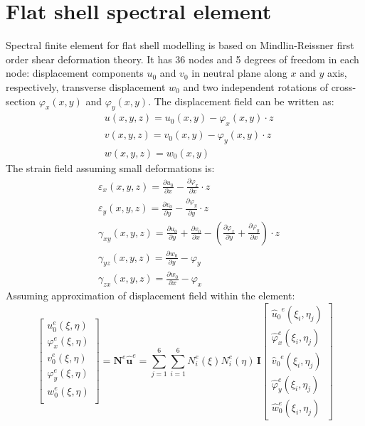 \documentclass[preprint,12pt]{elsarticle}
\renewcommand{\vec}[1]{\mathbf{#1}}
\renewcommand{\bm}[1]{\mathbf{#1}}
\begin{document}
	\section{Flat shell spectral element}
	Spectral finite element for flat shell modelling is based on Mindlin-Reissner first order shear deformation theory. It has 36 nodes and 5 degrees of freedom in each node: displacement components $u_0$ and $v_0$ in neutral plane along $x$ and $y$ axis, respectively, transverse displacement $w_0$ and two independent rotations of cross-section $\varphi_x(x,y)$ and $\varphi_y(x,y)$. The displacement field can be written as:
	\begin{equation}
	\begin{split}
	& u(x,y,z)=u_0(x,y) - \varphi_x(x,y) \cdot z\\
	& v(x,y,z)=v_0(x,y) - \varphi_y(x,y) \cdot z\\
	& w(x,y,z)=w_0(x,y) \label{eq:delam_platedispl}
	\end{split}
	\end{equation}
	The strain field assuming small deformations is:
	\begin{equation}
	\begin{split}
	& \varepsilon_x(x,y,z)= \frac{\partial u_0}{\partial x} - \frac{\partial \varphi_x}{\partial x} \cdot z\\
	& \varepsilon_y(x,y,z)=\frac{\partial v_0}{\partial y} - \frac{\partial \varphi_y}{\partial y} \cdot z\\
	& \gamma_{xy}(x,y,z)= \frac{\partial u_0}{\partial y} +  \frac{\partial v_0}{\partial x} - \left( \frac{\partial \varphi_x}{\partial y} + \frac{\partial \varphi_y}{\partial x}\right)\cdot z\\
	& \gamma_{yz}(x,y,z)= \frac{\partial w_0}{\partial y} - \varphi_y\\
	& \gamma_{zx}(x,y,z)= \frac{\partial w_0}{\partial x} - \varphi_x 
	\label{eq:delam_platestrains}
	\end{split}
	\end{equation}
	Assuming approximation of displacement field within the element:
	\begin{equation}
	\left[\begin{array}{l} u_0^e(\xi, \eta) \\ \varphi_x^e(\xi, \eta)\\ v_0^e(\xi, \eta) \\ \varphi_y^e(\xi, \eta)\\ w_0^e(\xi, \eta)\\ \end{array}\right] = \bm{N}^e \vec{\hat{u}}^e = \sum \limits_{j=1}^{6} \sum \limits_{i=1}^{6} N^e_i(\xi) N^e_i(\eta)\, \bm{I} \left[ \begin{array}{l} {\hat{u}_0}^e(\xi_i,\eta_j)\\\hat{\varphi}_x^e(\xi_i,\eta_j)\\{\hat{v}_0}^e(\xi_i,\eta_j) \\\hat{\varphi}_y^e(\xi_i,\eta_j) \\ \hat{w}_0^e(\xi_i,\eta_j)\end{array} \right]\label{eq:delam_plateaproxim}
	\end{equation}  
\end{document}
